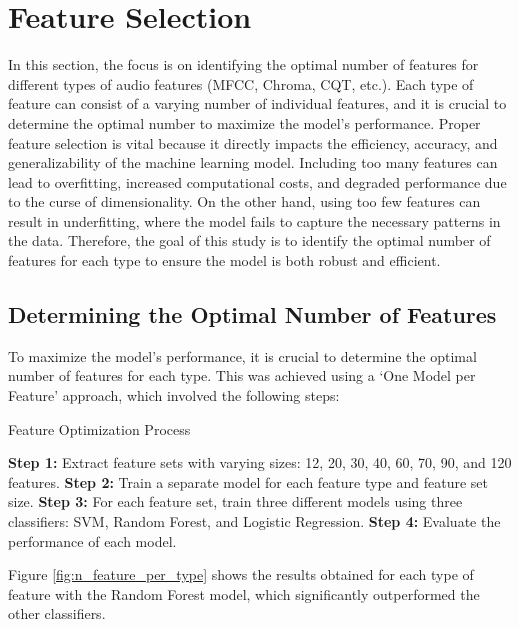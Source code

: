 \section{Feature Selection}
In this section, the focus is on identifying the optimal number of features for different types of audio features (MFCC, Chroma, CQT, etc.).
Each type of feature can consist of a varying number of individual features, and it is crucial to determine the optimal number to maximize
the model's performance. Proper feature selection is vital because it directly impacts the efficiency, accuracy,
and generalizability of the machine learning model. Including too many features can lead to overfitting, increased computational costs,
and degraded performance due to the curse of dimensionality. On the other hand, using too few features can result in underfitting,
where the model fails to capture the necessary patterns in the data. Therefore, the goal of this study is to identify the optimal number of features
for each type to ensure the model is both robust and efficient.

\subsection{Determining the Optimal Number of Features}

To maximize the model's performance, it is crucial to determine the optimal number of features for each type.
This was achieved using a `One Model per Feature' approach, which involved the following steps:

\begin{algorithm}
    \caption{Feature Optimization Process}
    \begin{algorithmic}[1]
        \State \textbf{Step 1:} Extract feature sets with varying sizes: 12, 20, 30, 40, 60, 70, 90, and 120 features.
        \State \textbf{Step 2:} Train a separate model for each feature type and feature set size.
        \State \textbf{Step 3:} For each feature set, train three different models using three classifiers: SVM, Random Forest, and Logistic Regression.
        \State \textbf{Step 4:} Evaluate the performance of each model.
    \end{algorithmic}
\end{algorithm}
\noindent
Figure \ref{fig:n_feature_per_type} shows the results obtained for each type of feature with the Random Forest model,
which significantly outperformed the other classifiers.


